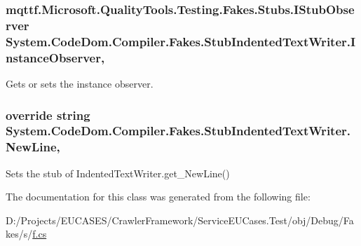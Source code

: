 \hypertarget{class_system_1_1_code_dom_1_1_compiler_1_1_fakes_1_1_stub_indented_text_writer_a23a3eb496ac7739df9e12b6986ba637a}{
\subsubsection[{Instance\-Observer}]{\setlength{\rightskip}{0pt plus 5cm}mqttf.\-Microsoft.\-Quality\-Tools.\-Testing.\-Fakes.\-Stubs.\-I\-Stub\-Observer System.\-Code\-Dom.\-Compiler.\-Fakes.\-Stub\-Indented\-Text\-Writer.\-Instance\-Observer\hspace{0.3cm}{\ttfamily [get]}, {\ttfamily [set]}}}\label{class_system_1_1_code_dom_1_1_compiler_1_1_fakes_1_1_stub_indented_text_writer_a23a3eb496ac7739df9e12b6986ba637a}


Gets or sets the instance observer.

\hypertarget{class_system_1_1_code_dom_1_1_compiler_1_1_fakes_1_1_stub_indented_text_writer_a451a0d4709a0d6cb5dd4f6289331a1a3}{
\subsubsection[{New\-Line}]{\setlength{\rightskip}{0pt plus 5cm}override string System.\-Code\-Dom.\-Compiler.\-Fakes.\-Stub\-Indented\-Text\-Writer.\-New\-Line\hspace{0.3cm}{\ttfamily [get]}, {\ttfamily [set]}}}\label{class_system_1_1_code_dom_1_1_compiler_1_1_fakes_1_1_stub_indented_text_writer_a451a0d4709a0d6cb5dd4f6289331a1a3}


Sets the stub of Indented\-Text\-Writer.\-get\-\_\-\-New\-Line()



The documentation for this class was generated from the following file\-:\begin{DoxyCompactItemize}
\item 
D\-:/\-Projects/\-E\-U\-C\-A\-S\-E\-S/\-Crawler\-Framework/\-Service\-E\-U\-Cases.\-Test/obj/\-Debug/\-Fakes/s/\hyperlink{s_2f_8cs}{f.\-cs}\end{DoxyCompactItemize}
